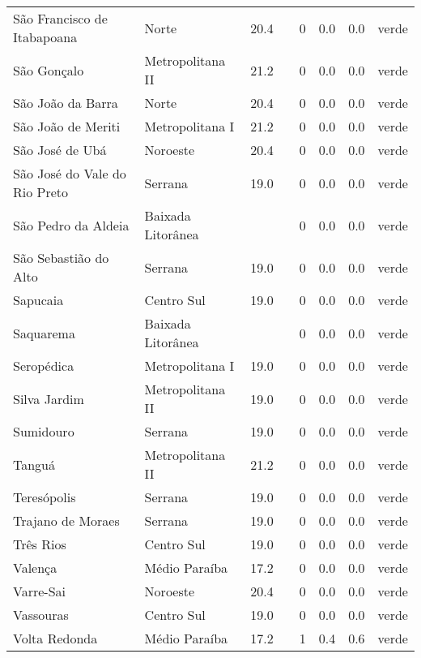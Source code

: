 \begin{longtable}{l|lllllll}
  São Francisco de Itabapoana & Norte & 20.4 &  & 0 & 0.0 & 0.0 & verde \\ 
  São Gonçalo & Metropolitana II & 21.2 &  & 0 & 0.0 & 0.0 & verde \\ 
  São João da Barra & Norte & 20.4 &  & 0 & 0.0 & 0.0 & verde \\ 
  São João de Meriti & Metropolitana I & 21.2 &  & 0 & 0.0 & 0.0 & verde \\ 
  São José de Ubá & Noroeste & 20.4 &  & 0 & 0.0 & 0.0 & verde \\ 
  São José do Vale do Rio Preto & Serrana & 19.0 &  & 0 & 0.0 & 0.0 & verde \\ 
  São Pedro da Aldeia & Baixada Litorânea &  &  & 0 & 0.0 & 0.0 & verde \\ 
  São Sebastião do Alto & Serrana & 19.0 &  & 0 & 0.0 & 0.0 & verde \\ 
  Sapucaia & Centro Sul & 19.0 &  & 0 & 0.0 & 0.0 & verde \\ 
  Saquarema & Baixada Litorânea &  &  & 0 & 0.0 & 0.0 & verde \\ 
  Seropédica & Metropolitana I & 19.0 &  & 0 & 0.0 & 0.0 & verde \\ 
  Silva Jardim & Metropolitana II & 19.0 &  & 0 & 0.0 & 0.0 & verde \\ 
  Sumidouro & Serrana & 19.0 &  & 0 & 0.0 & 0.0 & verde \\ 
  Tanguá & Metropolitana II & 21.2 &  & 0 & 0.0 & 0.0 & verde \\ 
  Teresópolis & Serrana & 19.0 &  & 0 & 0.0 & 0.0 & verde \\ 
  Trajano de Moraes & Serrana & 19.0 &  & 0 & 0.0 & 0.0 & verde \\ 
  Três Rios & Centro Sul & 19.0 &  & 0 & 0.0 & 0.0 & verde \\ 
  Valença & Médio Paraíba & 17.2 &  & 0 & 0.0 & 0.0 & verde \\ 
  Varre-Sai & Noroeste & 20.4 &  & 0 & 0.0 & 0.0 & verde \\ 
  Vassouras & Centro Sul & 19.0 &  & 0 & 0.0 & 0.0 & verde \\ 
  Volta Redonda & Médio Paraíba & 17.2 &  & 1 & 0.4 & 0.6 & verde \\ 
  \hline
\end{longtable}
